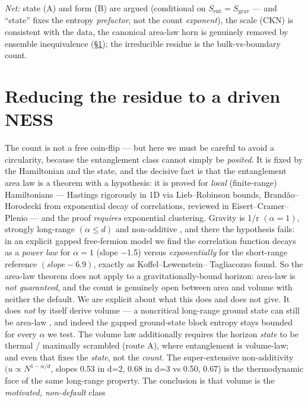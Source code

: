 \documentclass[aps,prd,preprint,nofootinbib,superscriptaddress]{revtex4-2}
\begin{document}
\emph{Net:} state (A) and form (B) are argued (conditional on
\(S_{\mathrm{ent}} = S_{\mathrm{grav}}\) --- and ``state'' fixes the
entropy \emph{prefactor}, not the count \emph{exponent}), the scale
(CKN) is consistent with the data, the canonical area-law horn is
genuinely removed by ensemble inequivalence (§\ref{sec-4}); the
irreducible residue is the bulk-vs-boundary count.

\section{Reducing the residue to a driven NESS}\label{sec-4}

The count is not a free coin-flip --- but here we must be careful to
avoid a circularity, because the entanglement class cannot simply be
\emph{posited}. It is fixed by the Hamiltonian and the state, and the
decisive fact is that the entanglement area law is a theorem with a
hypothesis: it is proved for \emph{local} (finite-range) Hamiltonians
--- Hastings \cite{Hastings:2007iok} rigorously in 1D via
Lieb--Robinson bounds, Brandão--Horodecki \cite{Brandao:2013fpa} from
exponential decay of correlations, reviewed in Eisert--Cramer--Plenio
\cite{Eisert:2008ur} --- and the proof \emph{requires} exponential
clustering. Gravity is 1/r \((\alpha  = 1)\), strongly long-range
\((\alpha  \leq  d)\) and non-additive \cite{Campa:2009jxa}, and there
the hypothesis fails: in an explicit gapped free-fermion model we find
the correlation function decays as a \emph{power law} for
\(\alpha  = 1\) (slope −1.5) versus \emph{exponentially} for the
short-range reference \((slope -6.9)\), exactly as Koffel--Lewenstein--
Tagliacozzo \cite{Koffel:2012zj} found. So the area-law theorem does
not apply to a gravitationally-bound horizon: area-law is \emph{not
guaranteed}, and the count is genuinely open between area and volume
with neither the default. We are explicit about what this does and does
not give. It does \emph{not} by itself derive volume --- a noncritical
long-range ground state can still be area-law \cite{Kuwahara:2019rlw},
and indeed the gapped ground-state block entropy stays bounded for every
\(\alpha\) we test. The volume law additionally requires the horizon
\emph{state} to be thermal / maximally scrambled (route A), where
entanglement is volume-law; and even that fixes the \emph{state}, not
the \emph{count}. The super-extensive non-additivity
\((u \propto  N^{1-\alpha /d}\), slopes 0.53 in d=2, 0.68 in d=3 vs
0.50, 0.67) is the thermodynamic face of the same long-range property.
The conclusion is that volume is the \emph{motivated, non-default} class
\end{document}
